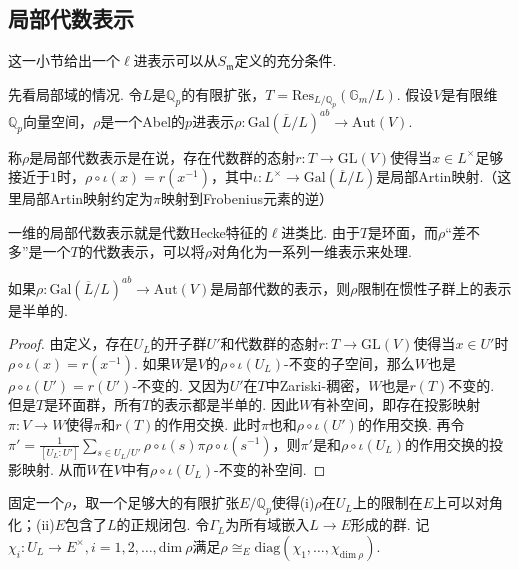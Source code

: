 \subsection{局部代数表示}

这一小节给出一个$\ell$进表示可以从$S_{\mathfrak{m}}$定义的充分条件.

先看局部域的情况.
令$L$是$\mathbb{Q}_p$的有限扩张，$T = \mathrm{Res}_{L/\mathbb{Q}_p}(\mathbb{G}_m / L)$.
假设$V$是有限维$\mathbb{Q}_p$向量空间，$\rho$是一个Abel的$p$进表示$\rho: \mathrm{Gal}(\overline{L}/L)^{ab} \to \mathrm{Aut}(V)$.

\begin{cdef}
    称$\rho$是局部代数表示是在说，存在代数群的态射$r:T\to \mathrm{GL}(V)$使得当$x\in L^{\times}$足够接近于$1$时，$\rho\circ \iota(x) = r(x^{-1})$，其中$\iota: L^{\times}\to \mathrm{Gal}(\overline{L}/L) $是局部Artin映射.（这里局部Artin映射约定为$\pi$映射到Frobenius元素的逆）
\end{cdef}

一维的局部代数表示就是代数Hecke特征的$\ell$进类比. 由于$T$是环面，而$\rho$“差不多”是一个$T$的代数表示，可以将$\rho$对角化为一系列一维表示来处理.

\begin{cprop}
    如果$\rho: \mathrm{Gal}(\overline{L}/L)^{ab} \to \mathrm{Aut}(V)$是局部代数的表示，则$\rho$限制在惯性子群上的表示是半单的.
\end{cprop}

\begin{proof}
    由定义，存在$U_L$的开子群$U'$和代数群的态射$r: T\to \mathrm{GL}(V)$使得当$x\in U'$时$\rho\circ \iota(x) = r(x^{-1})$. 如果$W$是$V$的$\rho\circ\iota(U_L)$-不变的子空间，那么$W$也是$\rho\circ\iota(U')=r(U')$-不变的. 又因为$U'$在$T$中Zariski-稠密，$W$也是$r(T)$不变的. 但是$T$是环面群，所有$T$的表示都是半单的. 因此$W$有补空间，即存在投影映射$\pi: V\to W$使得$\pi$和$r(T)$的作用交换. 此时$\pi$也和$\rho\circ\iota(U')$的作用交换. 再令$\pi' = \frac{1}{[U_L:U']} \sum_{s\in U_L/U'} \rho\circ \iota(s) \pi \rho\circ \iota(s^{-1})$，则$\pi'$是和$\rho\circ\iota(U_L)$的作用交换的投影映射. 从而$W$在$V$中有$\rho\circ\iota(U_L)$-不变的补空间.
\end{proof}

固定一个$\rho$，取一个足够大的有限扩张$E/\mathbb{Q}_p$使得(i)$\rho$在$U_L$上的限制在$E$上可以对角化；(ii)$E$包含了$L$的正规闭包. 令$\Gamma_{L}$为所有域嵌入$L\to E$形成的群. 记$\chi_i: U_L\to E^{\times}, i=1,2,\ldots,\mathrm{dim}\ \rho$满足$\rho \cong_{E} \mathrm{diag}(\chi_1,\ldots, \chi_{\mathrm{dim}\ \rho})$.

